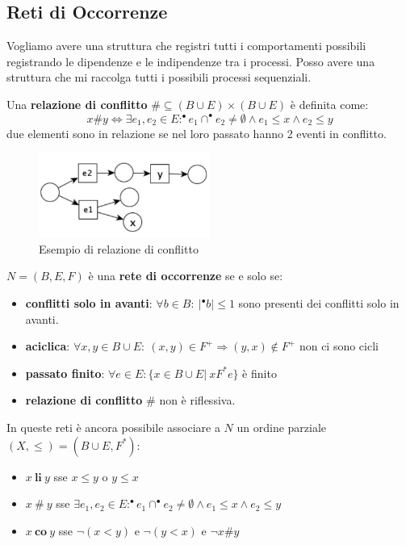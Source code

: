 \subsection{Reti di Occorrenze}
Vogliamo avere una struttura che registri tutti i comportamenti possibili
registrando le dipendenze e le indipendenze tra i processi. Posso avere una
struttura che mi raccolga tutti i possibili processi sequenziali.
\begin{definizione}
    Una \textbf{relazione di conflitto} $\#\subseteq (B\cup E)\times (B\cup E)$
    è definita come:
    \begin{equation}
        x\#y\iff \exists e_1,e_2\in E :^{\bullet}e_1 \cap ^{\bullet} e_2\ne \emptyset
        \land e_1\le x \land e_2\le y
    \end{equation}
    due elementi sono in relazione se nel loro passato hanno 2 eventi in conflitto.
\end{definizione}
\begin{figure}[!ht]
    \centering
    \includegraphics[width=0.5\textwidth]{img/reti/relazioneConflitto.png}
    \caption{Esempio di relazione di conflitto}
    \label{fig:relazioneConflitto}
\end{figure}
\begin{definizione}
    $N = (B, E, F)$ è una \textbf{rete di occorrenze} se e solo se:
    \begin{itemize}
        \item \textbf{conflitti solo in avanti}: $\forall b \in B: \ | ^{\bullet}b|
                  \leq 1$ sono presenti dei conflitti solo in avanti.
        \item \textbf{aciclica}: $\forall x, y \in B \cup E: \ (x, y) \in F^{+}
                  \Rightarrow (y, x) \notin F^{+}$
              non ci sono cicli
        \item\textbf{passato finito}: $\forall e \in E: \{x \in B \cup E| \
                  xF^{\ast} e \}$ è finito
        \item \textbf{relazione di conflitto} $\#$ non è riflessiva.
    \end{itemize}
\end{definizione}
In queste reti è ancora possibile associare a $N$ un ordine parziale
$(X, \leq) = (B \cup E, F^{\ast})$:
\begin{itemize}
    \item $x \ \textbf{li} \ y$ sse $x\le y$ o $y\le x$
    \item $x \ \# \ y$ sse $\exists e_1,e_2\in E :^{\bullet}e_1 \cap ^{\bullet} e_2\ne \emptyset
              \land e_1\le x \land e_2\le y$
    \item $x \ \textbf{co} \ y$ sse $\lnot (x<y)$ e $\lnot (y<x)$ e $\lnot x\#y$
\end{itemize}

